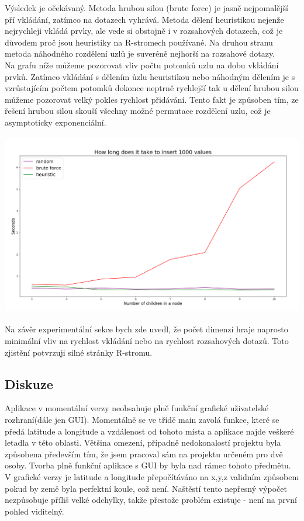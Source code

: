 \documentclass[12pt,a4paper]{article}
\begin{document}
Výsledek je očekávaný. Metoda hrubou silou (brute force) je jasně nejpomalější pří vkládání, zatímco na dotazech vyhrává. Metoda dělení heuristikou nejenže nejrychleji vkládá prvky, ale vede si obstojně i v rozsahových dotazech, což je důvodem proč jsou heuristiky na R-stromech používané. Na druhou stranu metoda náhodného rozdělení uzlů je suveréně nejhorší na rozsahové dotazy.\\[0.5cm]
Na grafu níže můžeme pozorovat vliv počtu potomků uzlu na dobu vkládání prvků. Zatímco vkládání s dělením ůzlu heuristikou nebo náhodným dělením je s vzrůstajícím počtem potomků dokonce neptrně rychlejší tak u dělení hrubou silou můžeme pozorovat velký pokles rychlost přidávání. Tento fakt je způsoben tím, ze řešení hrubou silou skouší všechny možné permutace rozdělení uzlu, což je asymptoticky exponenciální.

\begin{center}
\includegraphics[width=15cm, height=8cm]{nOfChildren}
\end{center}

Na závěr experimentální sekce bych zde uvedl, že počet dimenzí hraje naprosto minimální vliv na rychlost vkládání nebo na rychlost rozsahových dotazů. Toto zjistění potvrzuji silné stránky R-stromu.

\subsection*{Diskuze}
Aplikace v momentální verzy neobsahuje plně funkční grafické uživatelské rozhraní(dále jen GUI). Momentálně se ve třídě main zavolá funkce, které se předá latitude a longitude a vzdálenost od tohoto místa a aplikace najde veškeré letadla v této oblasti. Většina omezení, případně nedokonalostí projektu byla způsobena především tím, že jsem pracoval sám na projektu určeném pro dvě osoby. Tvorba plně funkční aplikace s GUI by byla nad rámec tohoto předmětu. V grafické verzy je latitude a longitude přepočítáváno na x,y,z validním způsobem pokud by země byla perfektní koule, což není. Naštěstí tento nepřesný výpočet nezpůsobuje příliš velké odchylky, takže přestože problém existuje - není na první pohled viditelný. 
\end{document}
